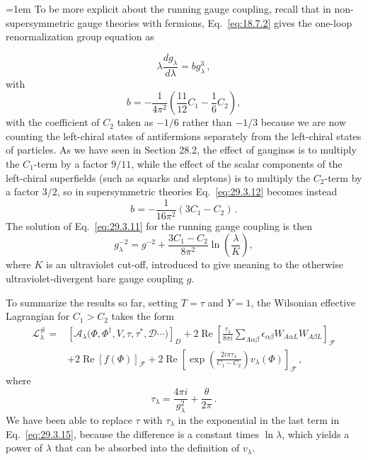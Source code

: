 \begingroup
\emergencystretch=1em
To be more explicit about the running gauge coupling, recall that in
non-super\-sym\-met\-ric gauge theories with fermions,
Eq.~\eqref{eq:18.7.2}
gives the one-loop renormalization group equation as
\par
\endgroup
\begin{equation}
  \lambda\frac{dg_\lambda}{d\lambda}=bg_\lambda^3\,,
  \tag{29.3.11}\label{eq:29.3.11}
\end{equation}
with
\begin{equation}
  b=-\frac{1}{4\pi^2}
  \left(\frac{11}{12}C_1-\frac16 C_2\right),
  \tag{29.3.12}\label{eq:29.3.12}
\end{equation}
with the coefficient of \(C_2\) taken as \(-1/6\) rather than \(-1/3\)
because we are now counting the left-chiral states of antifermions
separately from the left-chiral states of particles. As we have seen in
Section 28.2, the effect of gauginos is to multiply the \(C_1\)-term by a
factor \(9/11\), while the effect of the scalar components of the
left-chiral superfields (such as squarks and sleptons) is to multiply the
\(C_2\)-term by a factor \(3/2\), so in supersymmetric theories
Eq.~\eqref{eq:29.3.12} becomes instead
\begin{equation}
  b=-\frac{1}{16\pi^2}(3C_1-C_2)\,.
  \tag{29.3.13}\label{eq:29.3.13}
\end{equation}
The solution of Eq.~\eqref{eq:29.3.11} for the running gauge coupling is
then
\begin{equation}
  g_\lambda^{-2}
  =
  g^{-2}
  +\frac{3C_1-C_2}{8\pi^2}\ln\left(\frac{\lambda}{K}\right),
  \tag{29.3.14}\label{eq:29.3.14}
\end{equation}
where \(K\) is an ultraviolet cut-off, introduced to give meaning to the
otherwise ultraviolet-divergent bare gauge coupling \(g\).

To summarize the results so far, setting \(T=\tau\) and \(Y=1\), the
Wilsonian effective Lagrangian for \(C_1>C_2\) takes the form
\begin{equation}
  \begin{aligned}
  \mathcal{L}^{\#}_\lambda
  ={}&
  \left[
    \mathcal{A}_\lambda
    \bigl(\Phi,\Phi^\dagger,V,\tau,\tau^*,\mathcal{D}\cdots\bigr)
  \right]_D
  +2\operatorname{Re}
  \left[
    \frac{\tau_\lambda}{8\pi i}
    \sum_{A\alpha\beta}
    \epsilon_{\alpha\beta}W_{A\alpha L}W_{A\beta L}
  \right]_{\mathcal{F}}
  \\
  &+2\operatorname{Re}\left[f(\Phi)\right]_{\mathcal{F}}
  +2\operatorname{Re}\left[
    \exp\left(\frac{2i\pi\tau_\lambda}{C_1-C_2}\right)
    v_\lambda(\Phi)
  \right]_{\mathcal{F}}\,,
  \end{aligned}
  \tag{29.3.15}\label{eq:29.3.15}
\end{equation}
where
\begin{equation}
  \tau_\lambda=\frac{4\pi i}{g_\lambda^2}+\frac{\theta}{2\pi}\,.
  \tag{29.3.16}\label{eq:29.3.16}
\end{equation}
We have been able to replace \(\tau\) with \(\tau_\lambda\) in the
exponential in the last term in Eq.~\eqref{eq:29.3.15}, because the
difference is a constant times \(\ln\lambda\), which yields a power of
\(\lambda\) that can be absorbed into the definition of \(v_\lambda\).

